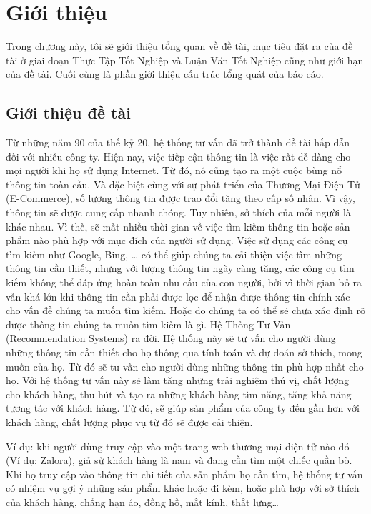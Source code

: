 \documentclass[a4paper,12pt,numbered,print,index,custombib, oneside, custommargin]{report}
\begin{document}
\listoftables


\chapter{Giới thiệu}

Trong chương này, tôi sẽ giới thiệu tổng quan về đề tài, mục tiêu đặt ra của đề tài ở giai đoạn Thực Tập Tốt Nghiệp và Luận Văn Tốt Nghiệp cũng như giới hạn của đề tài. Cuối cùng là phần giới thiệu cấu trúc tổng quát của báo cáo.

\section{Giới thiệu đề tài}
Từ những năm 90 của thế kỷ 20, hệ thống tư vấn đã trở thành đề tài hấp dẫn đối với nhiều công ty. Hiện nay, việc tiếp cận thông tin là việc rất dễ dàng cho mọi người khi họ sử dụng Internet. Từ đó, nó cũng tạo ra một cuộc bùng nổ thông tin toàn cầu. Và đặc biệt cùng với sự phát triển của Thương Mại Điện Tử (E-Commerce), số lượng thông tin được trao đổi tăng theo cấp số nhân. Vì vậy, thông tin sẽ được cung cấp nhanh chóng.
Tuy nhiên, sở thích của mỗi người là khác nhau. Vì thế, sẽ mất nhiều thời gian về việc tìm kiếm thông tin hoặc sản phẩm nào phù hợp với mục đích của người sử dụng. Việc sử dụng các công cụ tìm kiếm như Google, Bing, … có thể giúp chúng ta cải thiện việc tìm những thông tin cần thiết, nhưng với lượng thông tin ngày càng tăng, các công cụ tìm kiếm không thể đáp ứng hoàn toàn nhu cầu của con người, bởi vì thời gian bỏ ra vẫn khá lớn khi thông tin cần phải được lọc để nhận được thông tin chính xác cho vấn đề chúng ta muốn tìm kiếm. Hoặc do chúng ta có thể sẽ chưa xác định rõ được thông tin chúng ta muốn tìm kiếm là gì. 
Hệ Thống Tư Vấn (Recommendation Systems) ra đời. Hệ thống này sẽ tư vấn cho người dùng những thông tin cần thiết cho họ thông qua tính toán và dự đoán sở thích, mong muốn của họ. 
Từ đó sẽ tư vấn cho người dùng những thông tin phù hợp nhất cho họ. 
Với hệ thống tư vấn này sẽ làm tăng những trải nghiệm thú vị, chất lượng cho khách hàng, thu hút và tạo ra những khách hàng tìm năng, tăng khả năng tương tác với khách hàng. Từ đó, sẽ giúp sản phẩm của công ty đến gần hơn với khách hàng, chất lượng phục vụ từ đó sẽ được cải thiện.

Ví dụ: khi người dùng truy cập vào một trang web thương mại điện tử nào đó (Ví dụ: Zalora), giả sử khách hàng là nam và đang cần tìm một chiếc quần bò. Khi họ truy cập vào thông tin chi tiết của sản phẩm họ cần tìm, hệ thống tư vấn có nhiệm vụ gợi ý những sản phẩm khác hoặc đi kèm, hoặc phù hợp với sở thích của khách hàng, chẳng hạn áo, đồng hồ, mắt kính, thắt lưng…
\end{document}
